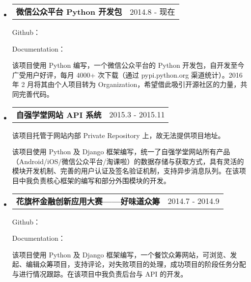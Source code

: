 \documentclass[a4paper,9pt]{article}
\makeatletter
\newcommand{\ressubheading}[2]{
  \begin{tabular*}{172mm}{l@{\extracolsep{\fill}}r}
    \textbf{#1} & #2
  \end{tabular*}\vspace{0pt}}
\makeatother
\begin{document}
\begin{itemize}
\item

  \ressubheading{微信公众平台 Python 开发包}{2014.8 - 现在}

  \begin{adjustwidth}{8mm}{8mm}

  \textnormal{Github：\color{link}{https://github.com/wechat-python-sdk/} }

  \textnormal{Documentation：\color{link}{http://wechat-python-sdk.com/}}

  \textnormal{该项目使用 Python 编写，一个微信公众平台的 Python 开发包，自开发至今广受用户好评，每月 4000+ 次下载（通过 pypi.python.org 渠道统计）。2016 年 2 月将其由个人项目转为 Organization，希望借此吸引开源社区的力量，共同完善代码。}

  \end{adjustwidth}

\end{itemize}

\begin{itemize}
\item
  \ressubheading{自强学堂网站 API 系统}{2015.3 - 2015.11}

  \begin{adjustwidth}{8mm}{8mm}

  \textnormal{该项目托管于网站内部 Private Repository 上，故无法提供项目地址。}

  \textnormal{该项目使用 Python 及 Django 框架编写，统一了自强学堂网站所有产品（Android/iOS/微信公众平台/淘课啦）的数据存储与获取方式，具有灵活的模块开发机制、完善的用户认证及签名验证机制，支持异步消息队列。在该项目中我负责核心框架的编写和部分外围模块的开发。}

  \end{adjustwidth}
\end{itemize}

\begin{itemize}
\item
  \ressubheading{花旗杯金融创新应用大赛——好味道众筹}{2014.7 - 2014.9}

  \begin{adjustwidth}{8mm}{8mm}

  \textnormal{Github：\color{link}{https://github.com/doraemonext/citi/}}

  \textnormal{Documentation：\color{link}{http://docs.citi.apiary.io/}}

  \textnormal{该项目使用 Python 及 Django 框架编写，一个餐饮众筹网站，可浏览、发起、编辑众筹项目，支持评论，对失败项目的处理，成功项目的阶段任务分配与进行情况跟踪。在该项目中我负责后台与 API 的开发。}

  \end{adjustwidth}
\end{itemize}
\end{document}
